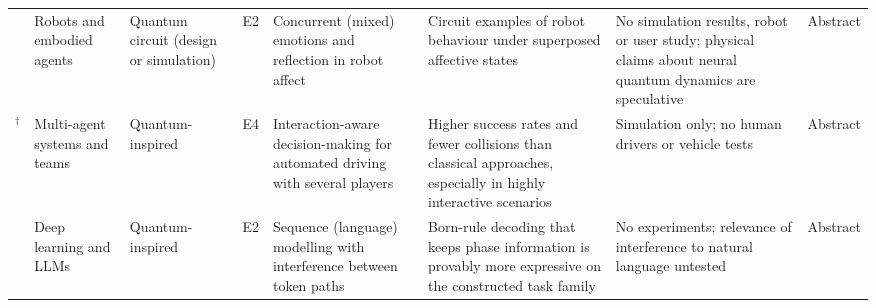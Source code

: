\documentclass[10pt,a4paper]{article}
\begin{document}
\begin{landscape}
\begin{longtable}{@{}P{3.0cm}P{2.2cm}P{2.1cm}P{0.6cm}P{4.2cm}P{4.6cm}P{4.4cm}P{1.0cm}@{}}
\citet{Hoorn2019} & Robots and embodied agents & Quantum circuit (design or simulation) & E2 & Concurrent (mixed) emotions and reflection in robot affect & Circuit examples of robot behaviour under superposed affective states & No simulation results, robot or user study; physical claims about neural quantum dynamics are speculative & Abstract \\
\citet{Essalmi2026}$^\dagger$ & Multi-agent systems and teams & Quantum-inspired & E4 & Interaction-aware decision-making for automated driving with several players & Higher success rates and fewer collisions than classical approaches, especially in highly interactive scenarios & Simulation only; no human drivers or vehicle tests & Abstract \\
\citet{Nebli2026} & Deep learning and LLMs & Quantum-inspired & E2 & Sequence (language) modelling with interference between token paths & Born-rule decoding that keeps phase information is provably more expressive on the constructed task family & No experiments; relevance of interference to natural language untested & Abstract \\
\end{longtable}
\end{landscape}
\end{document}
